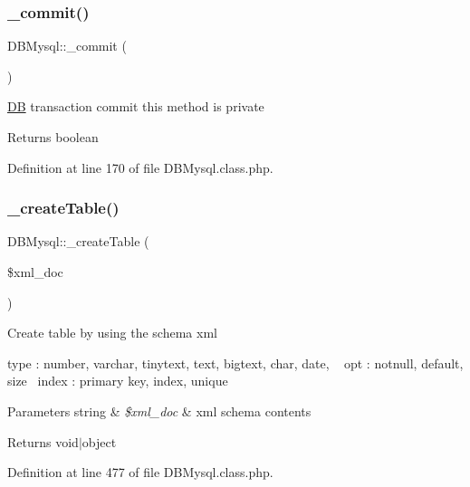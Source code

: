 \subsubsection{\texorpdfstring{\+\_\+commit()}{\_commit()}}
{\footnotesize\ttfamily D\+B\+Mysql\+::\+\_\+commit (\begin{DoxyParamCaption}{ }\end{DoxyParamCaption})}

\hyperlink{classDB}{DB} transaction commit this method is private \begin{DoxyReturn}{Returns}
boolean 
\end{DoxyReturn}


Definition at line 170 of file D\+B\+Mysql.\+class.\+php.

\mbox{\label{classDBMysql_a7a3edda6d00b0c7b3702283b495b0a5d}} 
\subsubsection{\texorpdfstring{\+\_\+create\+Table()}{\_createTable()}}
{\footnotesize\ttfamily D\+B\+Mysql\+::\+\_\+create\+Table (\begin{DoxyParamCaption}\item[{}]{\$xml\+\_\+doc }\end{DoxyParamCaption})}

Create table by using the schema xml

type \+: number, varchar, tinytext, text, bigtext, char, date, ~\newline
opt \+: notnull, default, size~\newline
index \+: primary key, index, unique~\newline

\begin{DoxyParams}[1]{Parameters}
string & {\em \$xml\+\_\+doc} & xml schema contents \\
\hline
\end{DoxyParams}
\begin{DoxyReturn}{Returns}
void$\vert$object 
\end{DoxyReturn}


Definition at line 477 of file D\+B\+Mysql.\+class.\+php.

\mbox{\label{classDBMysql_aa1f3d836a8da807793983ff3f48998da}} 
